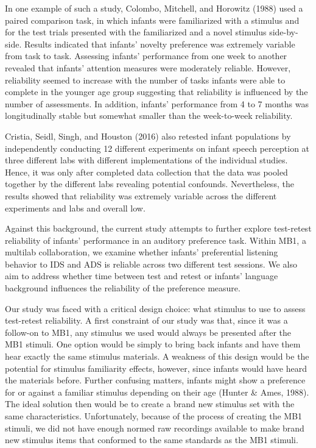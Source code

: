 \documentclass[
  man,floatsintext]{apa6}
\begin{document}
In one example of such a study, Colombo, Mitchell, and Horowitz (1988) used a paired comparison task, in which infants were familiarized with a stimulus and for the test trials presented with the familiarized and a novel stimulus side-by-side. Results indicated that infants' novelty preference was extremely variable from task to task. Assessing infants' performance from one week to another revealed that infants' attention measures were moderately reliable. However, reliability seemed to increase with the number of tasks infants were able to complete in the younger age group suggesting that reliability is influenced by the number of assessments. In addition, infants' performance from 4 to 7 months was longitudinally stable but somewhat smaller than the week-to-week reliability.

Cristia, Seidl, Singh, and Houston (2016) also retested infant populations by independently conducting 12 different experiments on infant speech perception at three different labs with different implementations of the individual studies. Hence, it was only after completed data collection that the data was pooled together by the different labs revealing potential confounds. Nevertheless, the results showed that reliability was extremely variable across the different experiments and labs and overall low.

Against this background, the current study attempts to further explore test-retest reliability of infants' performance in an auditory preference task. Within MB1, a multilab collaboration, we examine whether infants' preferential listening behavior to IDS and ADS is reliable across two different test sessions. We also aim to address whether time between test and retest or infants' language background influences the reliability of the preference measure.

Our study was faced with a critical design choice: what stimulus to use to assess test-retest reliability. A first constraint of our study was that, since it was a follow-on to MB1, any stimulus we used would always be presented after the MB1 stimuli. One option would be simply to bring back infants and have them hear exactly the same stimulus materials. A weakness of this design would be the potential for stimulus familiarity effects, however, since infants would have heard the materials before. Further confusing matters, infants might show a preference for or against a familiar stimulus depending on their age (Hunter \& Ames, 1988). The ideal solution then would be to create a brand new stimulus set with the same characteristics. Unfortunately, because of the process of creating the MB1 stimuli, we did not have enough normed raw recordings available to make brand new stimulus items that conformed to the same standards as the MB1 stimuli.
\end{document}
